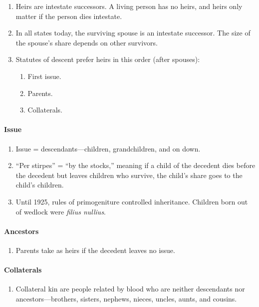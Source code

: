 \begin{enumerate}
    \item Heirs are intestate successors. A living person has no heirs, and 
    heirs only matter if the person dies intestate.
    \item In all states today, the surviving spouse is an intestate successor. 
    The size of the spouse's share depends on other survivors.
    \item Statutes of descent prefer heirs in this order (after spouses):
    \begin{enumerate}
        \item First issue.
        \item Parents.
        \item Collaterals.
    \end{enumerate}
\end{enumerate}

\paragraph{Issue}

\begin{enumerate}
    \item Issue = descendants---children, grandchildren, and on down.
    \item ``Per stirpes'' = ``by the stocks,'' meaning if a child of the 
    decedent dies before the decedent but leaves children who survive, the 
    child's share goes to the child's children.
    \item Until 1925, rules of primogeniture controlled inheritance. Children 
    born out of wedlock were \emph{filius nullius}.
\end{enumerate}

\paragraph{Ancestors}

\begin{enumerate}
    \item Parents take as heirs if the decedent leaves no issue.
\end{enumerate}

\paragraph{Collaterals}

\begin{enumerate}
    \item Collateral kin are people related by blood who are neither 
    descendants nor ancestors---brothers, sisters, nephews, nieces, uncles, 
    aunts, and cousins.
\end{enumerate}

